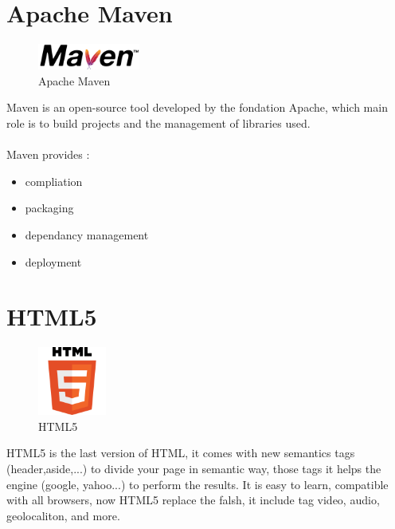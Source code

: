 \documentclass[12pt]{article}
\begin{document}
\section{Apache Maven}
\begin{figure}[h]
	\centering
	\includegraphics[width=0.3\textwidth]{Maven_logo.png}
	\caption{Apache Maven}
\end{figure}
Maven is an open-source tool developed by the fondation Apache, which main role is to build projects and the management of libraries used.
\\
\\
Maven provides :
\begin{itemize}
	\item compliation
	\item packaging
	\item dependancy management
	\item deployment
\end{itemize} 

\clearpage
\newpage

\section{HTML5}
\begin{figure}[h]
	\centering
	\includegraphics[width=0.2\textwidth]{HTML5_logo.png}
	\caption{HTML5}
\end{figure}
HTML5 is the last version of HTML, it comes with new semantics tags (header,aside,...) to divide your page in semantic way, those tags it helps the engine (google, yahoo...) to perform the results. It is easy to learn, compatible with all browsers, now HTML5 replace the falsh, it include tag video, audio, geolocaliton, and more. 
\end{document}
